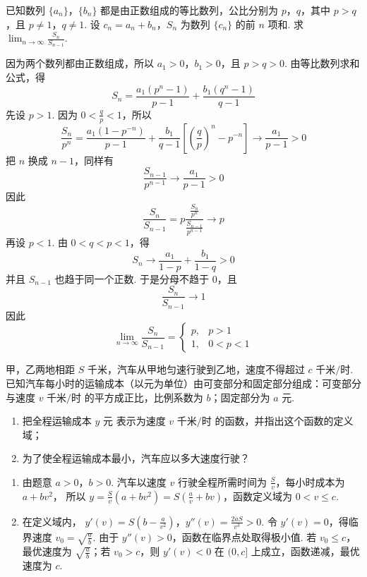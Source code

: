 \documentclass[UTF8,a4paper,oneside,11pt]{ctexbook}
\begin{document}
\begin{problem}
已知数列 \(\{a_{n}\}\)，\(\{b_{n}\}\) 都是由正数组成的等比数列，公比分别为 \(p\)，\(q\)，其中 \(p > q\)，且 \(p \neq 1\)，\(q \neq 1\). 设 \(c_{n} = a_{n} + b_{n}\)，\(S_{n}\) 为数列 \(\{c_{n}\}\) 的前 \(n\) 项和. 求 \(\displaystyle\lim_{n \to \infty} \frac{S_{n}}{S_{n-1}}\).
\end{problem}

\begin{solution}
因为两个数列都由正数组成，所以 \(a_{1}>0\)，\(b_{1}>0\)，且 \(p>q>0\). 由等比数列求和公式，得
\[
S_{n}=\frac{a_{1}(p^{n}-1)}{p-1}+\frac{b_{1}(q^{n}-1)}{q-1}
\]
先设 \(p>1\). 因为 \(0<\frac{q}{p}<1\)，所以
\[
\frac{S_{n}}{p^{n}}=\frac{a_{1}(1-p^{-n})}{p-1}+\frac{b_{1}}{q-1}\left[\left(\frac{q}{p}\right)^{n}-p^{-n}\right]\longrightarrow\frac{a_{1}}{p-1}>0
\]
把 \(n\) 换成 \(n-1\)，同样有
\[
\frac{S_{n-1}}{p^{n-1}}\longrightarrow\frac{a_{1}}{p-1}>0
\]
因此
\[
\frac{S_{n}}{S_{n-1}}=p\frac{\frac{S_{n}}{p^{n}}}{\frac{S_{n-1}}{p^{n-1}}}\longrightarrow p
\]
再设 \(p<1\). 由 \(0<q<p<1\)，得
\[
S_{n}\longrightarrow\frac{a_{1}}{1-p}+\frac{b_{1}}{1-q}>0
\]
并且 \(S_{n-1}\) 也趋于同一个正数. 于是分母不趋于 \(0\)，且
\[
\frac{S_{n}}{S_{n-1}}\longrightarrow1
\]
因此
\[
\lim_{n\to\infty}\frac{S_{n}}{S_{n-1}}=
\begin{cases}
p,&p>1\\
1,&0<p<1
\end{cases}
\]
\end{solution}

\begin{problem}
甲，乙两地相距 \(S\text{ 千米}\)，汽车从甲地匀速行驶到乙地，速度不得超过 \(c\text{ 千米/时}\). 已知汽车每小时的运输成本（以元为单位）由可变部分和固定部分组成：可变部分与速度 \(v\text{ 千米/时}\) 的平方成正比，比例系数为 \(b\)；固定部分为 \(a\text{ 元}\).

\begin{enumerate}
\item 把全程运输成本 \(y\text{ 元}\) 表示为速度 \(v\text{ 千米/时}\) 的函数，并指出这个函数的定义域；

\item 为了使全程运输成本最小，汽车应以多大速度行驶？
\end{enumerate}
\end{problem}

\begin{solution}
\begin{enumerate}
\item 由题意 \(a>0\)，\(b>0\). 汽车以速度 \(v\) 行驶全程所需时间为 \(\frac{S}{v}\)，每小时成本为 \(a+bv^{2}\)，
所以 \(y=\frac{S}{v}(a+bv^{2})=S\left(\frac{a}{v}+bv\right)\)，函数定义域为 \(0<v\leqslant c\).
\item 在定义域内，
\(y'(v)=S\left(b-\frac{a}{v^{2}}\right)\)，\(y''(v)=\frac{2aS}{v^{3}}>0\).
令 \(y'(v)=0\)，得临界速度 \(v_{0}=\sqrt{\frac{a}{b}}\). 由于 \(y''(v)>0\)，函数在临界点处取得极小值. 若 \(v_{0}\leqslant c\)，最优速度为 \(\sqrt{\frac{a}{b}}\)；若 \(v_{0}>c\)，则 \(y'(v)<0\) 在 \((0,c]\) 上成立，函数递减，最优速度为 \(c\).
\end{enumerate}
\end{solution}
\end{document}
